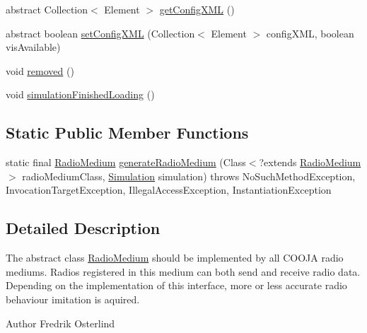 \begin{DoxyCompactItemize}
\item 
abstract Collection$<$ Element $>$ \hyperlink{classorg_1_1contikios_1_1cooja_1_1RadioMedium_a7029597231ff6a8f9f3fadc2c4d1c42c}{get\-Config\-X\-M\-L} ()
\item 
abstract boolean \hyperlink{classorg_1_1contikios_1_1cooja_1_1RadioMedium_ad254dbb634c35f33b2ee13597d14aa58}{set\-Config\-X\-M\-L} (Collection$<$ Element $>$ config\-X\-M\-L, boolean vis\-Available)
\item 
void \hyperlink{classorg_1_1contikios_1_1cooja_1_1RadioMedium_a91b2afc1b3dcf7f558e36eff4b3bc52b}{removed} ()
\item 
void \hyperlink{classorg_1_1contikios_1_1cooja_1_1RadioMedium_a75c1d2997520c3ad7ce190c73a484ef9}{simulation\-Finished\-Loading} ()
\end{DoxyCompactItemize}
\subsection*{Static Public Member Functions}
\begin{DoxyCompactItemize}
\item 
static final \hyperlink{classorg_1_1contikios_1_1cooja_1_1RadioMedium}{Radio\-Medium} \hyperlink{classorg_1_1contikios_1_1cooja_1_1RadioMedium_a92344f72831d4470231ac63757d8b8f5}{generate\-Radio\-Medium} (Class$<$?extends \hyperlink{classorg_1_1contikios_1_1cooja_1_1RadioMedium}{Radio\-Medium} $>$ radio\-Medium\-Class, \hyperlink{classorg_1_1contikios_1_1cooja_1_1Simulation}{Simulation} simulation)  throws No\-Such\-Method\-Exception, Invocation\-Target\-Exception,       Illegal\-Access\-Exception, Instantiation\-Exception 
\end{DoxyCompactItemize}


\subsection{Detailed Description}
The abstract class \hyperlink{classorg_1_1contikios_1_1cooja_1_1RadioMedium}{Radio\-Medium} should be implemented by all C\-O\-O\-J\-A radio mediums. Radios registered in this medium can both send and receive radio data. Depending on the implementation of this interface, more or less accurate radio behaviour imitation is aquired.

\begin{DoxyAuthor}{Author}
Fredrik Osterlind 
\end{DoxyAuthor}


